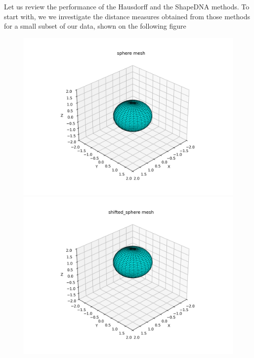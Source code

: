 \documentclass[11pt]{article}
\begin{document}
Let us review the performance of the Hausdorff and the ShapeDNA methods. To start with, we we investigate the distance measures obtained from those methods for a small subset of our data, shown on the following figure


\begin{figure}[H]
    \centering
    \begin{minipage}{0.3\textwidth}
        \centering
        \includegraphics[width=1.1\linewidth]{../figs/sphere.png}

    \end{minipage}%
    \hfill
    \begin{minipage}{0.3\textwidth}
        \centering
        \includegraphics[width=1.1\linewidth]{../figs/shifted_sphere.png}


\end{minipage}
\end{figure}
\end{document}
